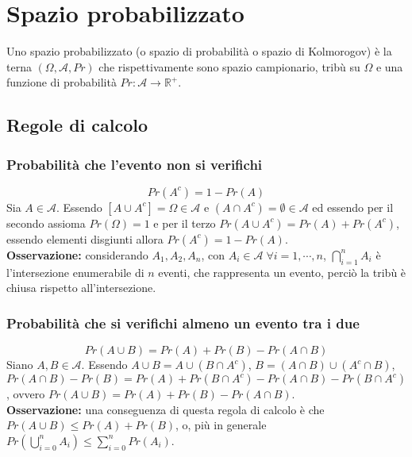 \section{Spazio probabilizzato}
Uno spazio probabilizzato (o spazio di probabilit\`a o spazio di Kolmorogov) \`e la terna $(\Omega, \mathcal{A}, Pr)$ che rispettivamente sono spazio 
campionario, trib\`u su $\Omega$ e una funzione di probabilit\`a $Pr:\mathcal{A}\rightarrow\mathbb{R}^+$.
\subsection{Regole di calcolo}
\subsubsection{Probabilit\`a che l'evento non si verifichi}
\begin{equation}
Pr(A^c)=1-Pr(A)
\end{equation}
Sia $A\in\mathcal{A}$. Essendo $[A\cup A^c]=\Omega\in\mathcal{A}$ e $(A\cap A^c)=\emptyset\in\mathcal{A}$ ed essendo per il secondo assioma $Pr(\Omega)=1$ 
e per il terzo $Pr(A\cup A^c)=Pr(A)+Pr(A^c)$, essendo elementi disgiunti allora $Pr(A^c)=1-Pr(A)$.\\
\textbf{Osservazione:} considerando $A_1,A_2,A_n$, con $A_i\in\mathcal{A}\;\forall i=1,\cdots,n$, $\bigcap\limits_{i=1}^nA_i$ \`e l'intersezione 
enumerabile di $n$ eventi, che rappresenta un evento, perci\`o la trib\`u \`e chiusa rispetto all'intersezione.
\subsubsection{Probabilit\`a che si verifichi almeno un evento tra i due}
\begin{equation}
Pr(A\cup B)=Pr(A)+Pr(B)-Pr(A\cap B)
\end{equation}
Siano $A,B\in\mathcal{A}$. Essendo $A\cup B=A\cup(B\cap A^c)$, $B=(A\cap B)\cup(A^c\cap B)$, $Pr(A\cap B)-Pr(B)=Pr(A)+Pr(B\cap A^c)-Pr(A\cap B)-Pr(B\cap 
A^c)$, ovvero $Pr(A\cup B)=Pr(A)+Pr(B)-Pr(A\cap B)$.\\
\textbf{Osservazione:} una conseguenza di questa regola di calcolo \`e che $Pr(A\cup B)\le Pr(A)+Pr(B)$, o, pi\`u in generale $Pr(\bigcup\limits_{i=0}
^nA_i)\le\sum\limits_{i=0}^nPr(A_i)$.
